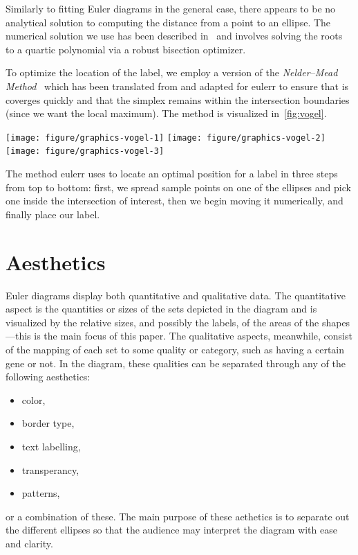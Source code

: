 \documentclass[
  oneside,
  openany,
  numbers=noendperiod,
  parskip=half,
  bibliography=totoc
]{scrbook}\usepackage[]{graphicx}\usepackage{xcolor}
\newenvironment{knitrout}{}{} %
\newcommand{\pkg}[1]{{\fontseries{b}\selectfont #1}}
\begin{document}
Similarly to fitting Euler diagrams in the general case, there appears to be no
analytical solution to computing the distance from a point to an ellipse. The
numerical solution we use has been described in~\citet{Eberly_2016a} and
involves solving the roots to a quartic polynomial via a robust
bisection optimizer.

To optimize the location of the label, we employ a version of the
\emph{Nelder--Mead Method}~\citep{nelder_1965} which has been translated from
\citet{kelley_1999} and adapted for \pkg{eulerr} to ensure that is coverges
quickly and that the simplex remains within the intersection boundaries
(since we want the local maximum). The method is visualized in~\cref{fig:vogel}.
\begin{marginfigure}
\begin{knitrout}\small
{}\color{fgcolor}

{\centering \texttt{[image: figure/graphics-vogel-1]} 
\texttt{[image: figure/graphics-vogel-2]} 
\texttt{[image: figure/graphics-vogel-3]} 

}



\end{knitrout}
\caption{The method eulerr uses to locate an optimal position for a label in
three steps from top to bottom: first, we spread sample points on one of the
ellipses and pick one inside the intersection of interest, then we begin moving
it numerically, and finally place our label.}
\label{fig:vogel}
\end{marginfigure}

\section{Aesthetics}
\label{sec:aesthetics}

Euler diagrams display both quantitative and qualitative data. The quantitative
aspect is the quantities or sizes of the sets depicted in the diagram and is
visualized by the relative sizes, and possibly the labels, of the areas of the
shapes---this is the main focus of this paper. The qualitative aspects,
meanwhile, consist of the mapping of each set to some quality or category, such
as having a certain gene or not. In the diagram, these qualities can be
separated through any of the following aesthetics:
%
\begin{itemize}
\item color,
\item border type,
\item text labelling,
\item transperancy,
\item patterns,
\end{itemize}
%
or a combination of these. The main purpose of these aethetics is to separate
out the different ellipses so that the audience may interpret the diagram with
ease and clarity.
\end{document}
